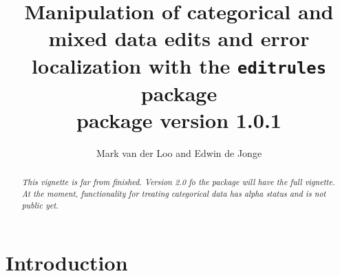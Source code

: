 \documentclass[11pt, fleqn, a4paper]{article}
\title{Manipulation of categorical and mixed data edits and error localization with the {\tt editrules} package\\
{\small package version 1.0.1}}
\author{Mark van der Loo and Edwin de Jonge}
\begin{document}
\maketitle
\begin{abstract}
{\em This vignette is far from finished. Version 2.0 fo the package will have
the full vignette. At the moment, functionality for treating categorical data has alpha status and is not public yet.}
\end{abstract}

\newpage
\tableofcontents
\newpage

\section{Introduction}


%
\end{document}
